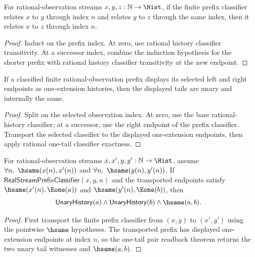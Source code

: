\begin{theorem}
\label{thm:real-stream-prefix-classifier-trans}
For rational-observation streams $x,y,z:\mathbb{N}\to\Hist$, if the finite
prefix classifier relates $x$ to $y$ through index $n$ and relates $y$
to $z$ through the same index, then it relates $x$ to $z$ through
index $n$.
\end{theorem}
\begin{proof}
Induct on the prefix index. At zero, use rational history classifier
transitivity. At a successor index, combine the induction hypothesis for the
shorter prefix with rational history classifier transitivity at the new
endpoint.
\end{proof}

\begin{theorem}
\label{thm:real-stream-prefix-e1-pair-readback}
If a classified finite rational-observation prefix displays its selected left and right endpoints as one-extension histories, then the displayed tails are unary and internally the same.
\end{theorem}
\begin{proof}
Split on the selected observation index. At zero, use the base rational-history classifier; at a successor, use the right endpoint of the prefix classifier. Transport the selected classifier to the displayed one-extension endpoints, then apply rational one-tail classifier exactness.
\end{proof}

\begin{theorem}
\label{thm:real-stream-prefix-classifier-hsame-e1-pair-readback}
For rational-observation streams $x,x',y,y':\mathbb{N}\to\Hist$, assume
$\forall n,\ \hsame(x(n),x'(n))$ and
$\forall n,\ \hsame(y(n),y'(n))$. If
$\mathsf{RealStreamPrefixClassifier}(x,y,n)$ and the transported endpoints
satisfy $\hsame(x'(n),\Eone(a))$ and $\hsame(y'(n),\Eone(b))$, then
$$
\mathsf{UnaryHistory}(a)\land \mathsf{UnaryHistory}(b)\land \hsame(a,b).
$$
\end{theorem}
\begin{proof}
First transport the finite prefix classifier from $(x,y)$ to $(x',y')$ using
the pointwise $\hsame$ hypotheses. The transported prefix has displayed
one-extension endpoints at index $n$, so the one-tail pair readback theorem
returns the two unary tail witnesses and $\hsame(a,b)$.
\end{proof}

